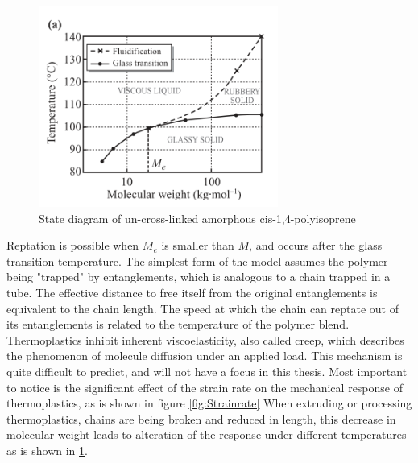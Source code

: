 \begin{figure}[htb]
    \centering
    \includegraphics[width=0.7\textwidth]{chapter_2/figures/polymerphases.PNG}
    \caption{State diagram of un-cross-linked amorphous cis-1,4-polyisoprene \cite{Halary2011PolymerMaterials}}
    \label{fig:polymerphase}
\end{figure}
Reptation is possible when $M_e$ is smaller than $M$, and occurs after the glass transition temperature. The simplest form of the model assumes the polymer being "trapped" by entanglements, which is analogous to a chain trapped in a tube. The effective distance to free itself from the original entanglements is equivalent to the chain length. The speed at which the chain can reptate out of its entanglements is related to the temperature of the polymer blend\cite{Halary2011PolymerMaterials}.  
Thermoplastics inhibit inherent viscoelasticity, also called creep, which describes the phenomenon of molecule diffusion under an applied load. This mechanism is quite difficult to predict, and will not have a focus in this thesis. Most important to notice is the significant effect of the strain rate on the mechanical response of thermoplastics, as is shown in figure \ref{fig:Strainrate}
When extruding or processing thermoplastics, chains are being broken and reduced in length, this decrease in molecular weight leads to alteration of the response under different temperatures as is shown in \ref{fig:polymerphase}.

